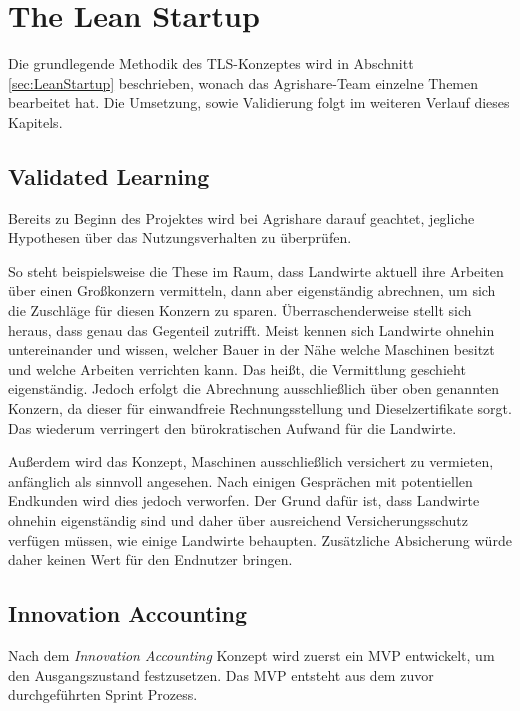 \section{The Lean Startup}
Die grundlegende Methodik des \ac{TLS}-Konzeptes wird in Abschnitt \ref{sec:LeanStartup} beschrieben, wonach das Agrishare-Team einzelne Themen bearbeitet hat. Die Umsetzung, sowie Validierung folgt im weiteren Verlauf dieses Kapitels.
\subsection*{\label{sec:LeanStartup-Umsetzung-ValidatedLearning}\thesubsection\quad Validated Learning}
Bereits zu Beginn des Projektes wird bei Agrishare darauf geachtet, jegliche Hypothesen über das Nutzungsverhalten zu überprüfen. 

So steht beispielsweise die These im Raum, dass Landwirte aktuell ihre Arbeiten über einen Großkonzern vermitteln, dann aber eigenständig abrechnen, um sich die Zuschläge für diesen Konzern zu sparen. Überraschenderweise stellt sich heraus, dass genau das Gegenteil zutrifft. Meist kennen sich Landwirte ohnehin untereinander und wissen, welcher Bauer in der Nähe welche Maschinen besitzt und welche Arbeiten verrichten kann. Das heißt, die Vermittlung geschieht eigenständig. Jedoch erfolgt die Abrechnung ausschließlich über oben genannten Konzern, da dieser für einwandfreie Rechnungsstellung und Dieselzertifikate sorgt. Das wiederum verringert den bürokratischen Aufwand für die Landwirte.

Außerdem wird das Konzept, Maschinen ausschließlich versichert zu vermieten, anfänglich als sinnvoll angesehen. Nach einigen Gesprächen mit potentiellen Endkunden wird dies jedoch verworfen. Der Grund dafür ist, dass Landwirte ohnehin eigenständig sind und daher über ausreichend Versicherungsschutz verfügen müssen, wie einige Landwirte behaupten. Zusätzliche Absicherung würde daher keinen Wert für den Endnutzer bringen.

\subsection*{\label{sec:LeanStartup-Umsetzung-InnovationAccounting}\thesubsection\quad Innovation Accounting}
Nach dem \textit{Innovation Accounting} Konzept wird zuerst ein MVP entwickelt, um den Ausgangszustand festzusetzen. Das \ac{MVP} entsteht aus dem zuvor durchgeführten Sprint Prozess.

